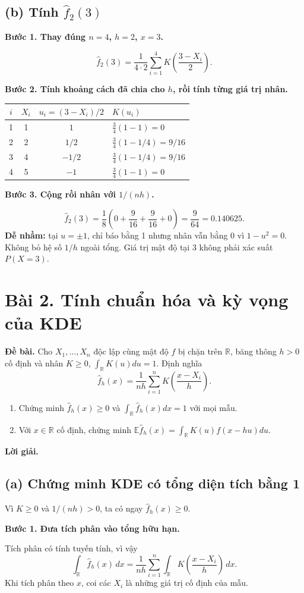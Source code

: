 \documentclass[11pt,a4paper]{article}
\newcommand{\E}{\mathbb E}
\newcommand{\R}{\mathbb R}
\newcommand{\fh}{\widehat f_h}
\newcommand{\buoc}[1]{\par\medskip\textbf{#1}\par}
\begin{document}
\subsection*{(b) Tính $\widehat f_2(3)$}
\buoc{Bước 1. Thay đúng $n=4$, $h=2$, $x=3$.}
\[
\widehat f_2(3)=\frac1{4\cdot2}\sum_{i=1}^4K\!\left(\frac{3-X_i}{2}\right).
\]
\buoc{Bước 2. Tính khoảng cách đã chia cho $h$, rồi tính từng giá trị nhân.}
\begin{center}
\begin{tabular}{cccl}
\toprule
$i$ & $X_i$ & $u_i=(3-X_i)/2$ & $K(u_i)$\\
\midrule
1&1&$1$&$\frac34(1-1)=0$\\
2&2&$1/2$&$\frac34(1-1/4)=9/16$\\
3&4&$-1/2$&$\frac34(1-1/4)=9/16$\\
4&5&$-1$&$\frac34(1-1)=0$\\
\bottomrule
\end{tabular}
\end{center}
\buoc{Bước 3. Cộng rồi nhân với $1/(nh)$.}
\[
\boxed{\widehat f_2(3)=\frac18\left(0+\frac9{16}+\frac9{16}+0\right)
=\frac9{64}=0.140625.}
\]
\textbf{Dễ nhầm:} tại $u=\pm1$, chỉ báo bằng 1 nhưng nhân vẫn bằng 0 vì $1-u^2=0$. Không bỏ hệ số $1/h$ ngoài tổng. Giá trị mật độ tại 3 không phải xác suất $P(X=3)$.
\endgroup

\clearpage
\section*{Bài 2. Tính chuẩn hóa và kỳ vọng của KDE}\label{core:expectation}
\textbf{Đề bài.} Cho $X_1,\ldots,X_n$ độc lập cùng mật độ $f$ bị chặn trên $\R$,
băng thông $h>0$ cố định và nhân $K\geq0$, $\int_{\R}K(u)du=1$. Định nghĩa
\[
\widehat f_h(x)=\frac1{nh}\sum_{i=1}^nK\left(\frac{x-X_i}{h}\right).
\]
\begin{enumerate}[label=(\alph*)]
\item Chứng minh $\widehat f_h(x)\geq0$ và $\int_{\R}\widehat f_h(x)dx=1$ với mọi mẫu.
\item Với $x\in\R$ cố định, chứng minh
$\E\widehat f_h(x)=\int_{\R}K(u)f(x-hu)du$.
\end{enumerate}
\textbf{Lời giải.}
\subsection*{(a) Chứng minh KDE có tổng diện tích bằng 1}
Vì $K\geq0$ và $1/(nh)>0$, ta có ngay $\widehat f_h(x)\geq0$.
\buoc{Bước 1. Đưa tích phân vào tổng hữu hạn.}
Tích phân có tính tuyến tính, vì vậy
\[
\int_{\R}\fh(x)\,dx
=\frac1{nh}\sum_{i=1}^n\int_{\R}K\!\left(\frac{x-X_i}{h}\right)\,dx.
\]
Khi tích phân theo $x$, coi các $X_i$ là những giá trị cố định của mẫu.
\end{document}
